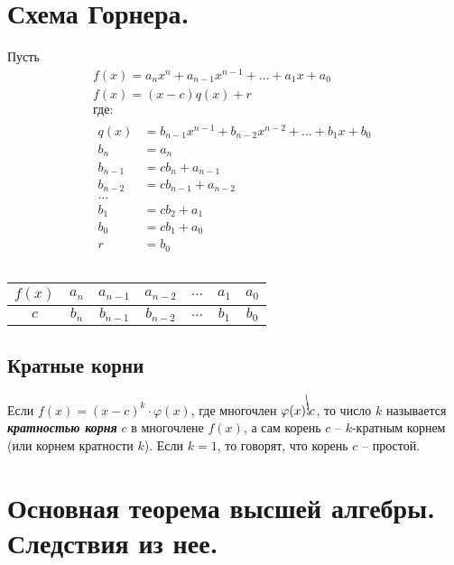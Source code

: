 \documentclass[12pt, fleqn]{article}
\begin{document}
\section{Схема Горнера.}
Пусть 
\begin{multline*}
	f(x)=a_nx^n+a_{n-1}x^{n-1}+\dots +a_1x+a_0\\
	f(x)=(x-c)q(x)+r\\
	\text{где}\colon\\
	\begin{aligned}
		q(x) &= b_{n-1}x^{n-1}+b_{n-2}x^{n-2}+\dots +b_1x+b_0\\
		b_{n}&=a_n\\
		b_{n-1}&=cb_{n}+a_{n-1}\\
		b_{n-2}&=cb_{n-1}+a_{n-2}\\
		\dots \\
		b_1&=cb_2+a_1\\
		b_0&=cb_1+a_0\\
		r&=b_0\\
	\end{aligned}\\
\end{multline*}
\begin{tabular}{ c| c | c | c | c| c | c} 
	\hline
	$f(x)$ & $a_n$ & $a_{n-1}$ & $a_{n-2}$ & $\dots $& $a_1$ & $a_0$\\
	\hline
	$c$ & $b_n$ & $b_{n-1}$ & $b_{n-2}$& $\dots $& $b_1$ & $b_0$\\
	\hline
\end{tabular}
\subsection*{Кратные корни}
Если $f(x)=\left(x-c\right)^k\cdot\varphi(x)$, где многочлен $\varphi(x)\bcancel\vdots c$, то число $k$ называется \textit{\textbf{кратностью корня}} $c$ в многочлене $f(x)$, а сам корень $c$ -- $k$-кратным корнем (или корнем кратности $k$). Если $k=1$, то говорят, что корень $c$ -- простой.
\section{Основная теорема высшей алгебры. Следствия из нее.}
\end{document}

